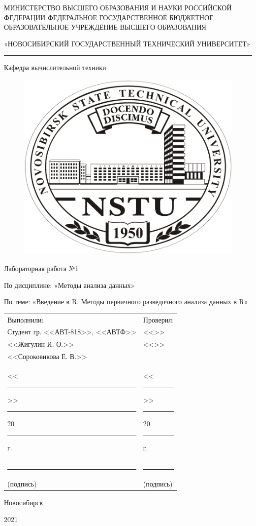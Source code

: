 \thispagestyle{empty}
\begin{center}

МИНИСТЕРСТВО ВЫСШЕГО ОБРАЗОВАНИЯ И НАУКИ РОССИЙСКОЙ ФЕДЕРАЦИИ
ФЕДЕРАЛЬНОЕ ГОСУДАРСТВЕННОЕ БЮДЖЕТНОЕ
ОБРАЗОВАТЕЛЬНОЕ УЧРЕЖДЕНИЕ
ВЫСШЕГО ОБРАЗОВАНИЯ

«НОВОСИБИРСКИЙ ГОСУДАРСТВЕННЫЙ ТЕХНИЧЕСКИЙ УНИВЕРСИТЕТ»

\noindent\rule{\textwidth}{0.4pt}

Кафедра вычислительной техники

\begin{figure}[H]
	\centering
	\includegraphics{title/logo.jpeg}
\end{figure}

Лабораторная работа №1

По дисциплине: «Методы анализа данных»

По теме: «Введение в R. Методы первичного разведочного анализа данных в R»

\end{center}

\noindent\begin{tabular}{p{}p{}}
	Выполнили: & Проверил: \\
	Студент гр. <<АВТ-818>>, <<АВТФ>> & <<>>\\
	<<Жигулин И. О.>> & <<>> \\
	<<Сороковикова Е. В.>> & \\
	<<\rule{1.5em}{0.4pt}>> \rule{5em}{0.4pt} 20\rule{1.5em}{0.4pt}г. & <<\rule{1.5em}{0.4pt}>> \rule{5em}{0.4pt} 20\rule{1.5em}{0.4pt}г.\\
	\rule{7.5em}{0.4pt} & \rule{7.5em}{0.4pt} \\
	\hspace{1.5em}(подпись) & \hspace{1.5em}(подпись)
\end{tabular}


\begin{center}

\vspace{2.3cm}

Новосибирск

2021
\end{center}
